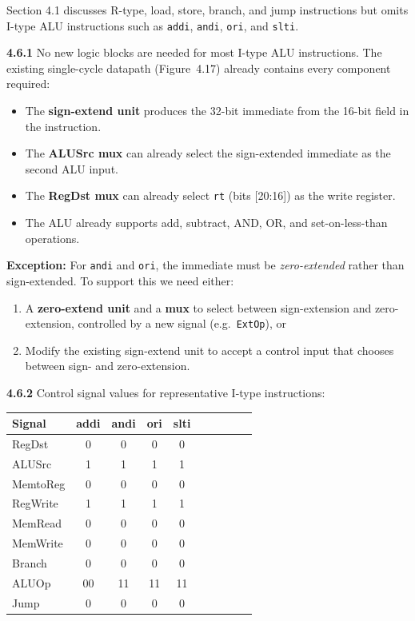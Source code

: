 Section 4.1 discusses R-type, load, store, branch, and jump instructions
but omits I-type ALU instructions such as \texttt{addi}, \texttt{andi},
\texttt{ori}, and \texttt{slti}.

\medskip\noindent\textbf{4.6.1}
No new logic blocks are needed for most I-type ALU instructions.  The
existing single-cycle datapath (Figure~4.17) already contains every
component required:

\begin{itemize}
  \item The \textbf{sign-extend unit} produces the 32-bit immediate from the
        16-bit field in the instruction.
  \item The \textbf{ALUSrc mux} can already select the sign-extended
        immediate as the second ALU input.
  \item The \textbf{RegDst mux} can already select \texttt{rt}
        (bits [20:16]) as the write register.
  \item The ALU already supports add, subtract, AND, OR, and set-on-less-than
        operations.
\end{itemize}

\noindent\textbf{Exception:} For \texttt{andi} and \texttt{ori}, the
immediate must be \emph{zero-extended} rather than sign-extended.  To support
this we need either:
\begin{enumerate}
  \item A \textbf{zero-extend unit} and a \textbf{mux} to select between
        sign-extension and zero-extension, controlled by a new signal
        (e.g.\ \texttt{ExtOp}), or
  \item Modify the existing sign-extend unit to accept a control input that
        chooses between sign- and zero-extension.
\end{enumerate}

\medskip\noindent\textbf{4.6.2}
Control signal values for representative I-type instructions:

\begin{center}
\begin{tabular}{lccccccccc}
\toprule
\textbf{Signal} & \textbf{addi} & \textbf{andi} & \textbf{ori} & \textbf{slti} \\
\midrule
RegDst   & 0  & 0  & 0  & 0  \\
ALUSrc   & 1  & 1  & 1  & 1  \\
MemtoReg & 0  & 0  & 0  & 0  \\
RegWrite & 1  & 1  & 1  & 1  \\
MemRead  & 0  & 0  & 0  & 0  \\
MemWrite & 0  & 0  & 0  & 0  \\
Branch   & 0  & 0  & 0  & 0  \\
ALUOp    & 00 & 11 & 11 & 11 \\
Jump     & 0  & 0  & 0  & 0  \\
\bottomrule
\end{tabular}
\end{center}


